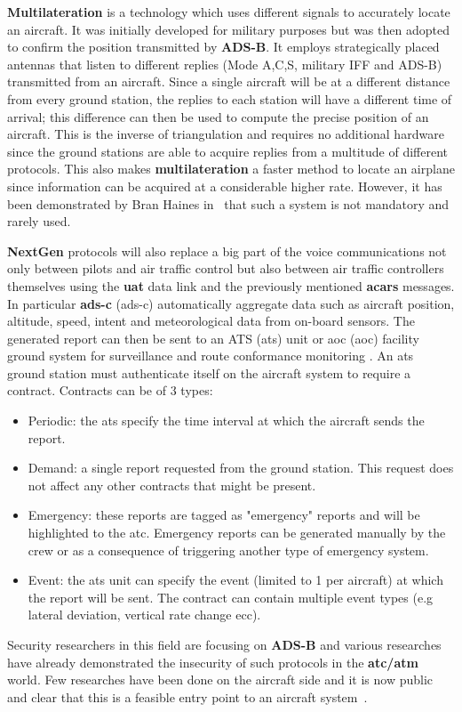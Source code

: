 \documentclass[../main.tex]{subfiles}
\begin{document}
\textbf{Multilateration} is a technology which uses different signals to accurately locate an aircraft. It was initially developed for military purposes but was then adopted to confirm the position transmitted by \textbf{ADS-B}. It employs strategically placed antennas that listen to different replies (Mode A,C,S, military IFF and ADS-B) transmitted from an aircraft. Since a single aircraft will be at a different distance from every ground station, the replies to each station will have a different time of arrival; this difference can then be used to compute the precise position of an aircraft. This is the inverse of triangulation and requires no additional hardware since the ground stations are able to acquire replies from a multitude of different protocols. This also makes \textbf{multilateration} a faster method to locate an airplane since information can be acquired at a considerable higher rate. However, it has been demonstrated by Bran Haines in~\cite{haineshackfest} that such a system is not mandatory and rarely used.

\textbf{NextGen} protocols will also replace a big part of the voice communications not only between pilots and air traffic control but also between air traffic controllers themselves using the \textbf{\acrshort{uat}} data link and the previously mentioned \textbf{\acrshort{acars}} messages.
In particular \textbf{\acrshort{ads-c}} (\acrlong{ads-c}) automatically aggregate data such as aircraft position, altitude, speed, intent and meteorological data from on-board sensors. The generated report can then be sent to an ATS (\acrlong{ats}) unit or \acrshort{aoc} (\acrlong{aoc}) facility ground system for surveillance and route conformance monitoring \cite{goldman}. An \acrshort{ats} ground station must authenticate itself on the aircraft system to require a contract. Contracts can be of 3 types:

\begin{itemize}
  \item Periodic: the \acrshort{ats} specify the time interval at which the aircraft sends the report.
  \item Demand: a single report requested from the ground station. This request does not affect any other contracts that might be present.
  \item Emergency: these reports are tagged as "emergency" reports and will be highlighted to the \acrshort{atc}. Emergency reports can be generated manually by the crew or as a consequence of triggering another type of emergency system.
  \item Event: the \acrshort{ats} unit can specify the event (limited to 1 per aircraft) at which the report will be sent. The contract can contain multiple event types (e.g lateral deviation, vertical rate change ecc).
\end{itemize}

Security researchers in this field are focusing on \textbf{ADS-B} and various researches \cite{costin2012ghost,renderman} have already demonstrated the insecurity of such protocols in the \textbf{\acrshort{atc}/\acrshort{atm}} world. Few researches have been done on the aircraft side and it is now public and clear that this is a feasible entry point to an aircraft system~\cite{news-boeinghack-cso}.
\end{document}
